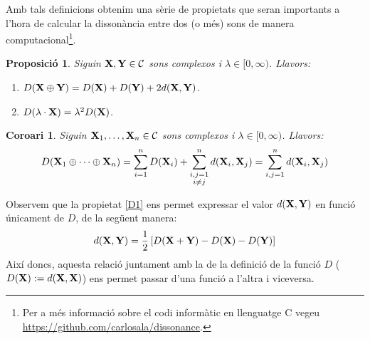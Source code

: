 \documentclass{article}
\theoremstyle{math}
\newtheorem{prop}[definition]{Proposició}
\newtheorem{corollary}[definition]{Coro\lgem ari}
\theoremstyle{TheoremNum}
\newcommand{\0}{\ensuremath{\vb{0}}}
\newcommand{\X}{\ensuremath{\vb{X}}}
\newcommand{\Y}{\ensuremath{\vb{Y}}}
\begin{document}
\noindent Amb tals definicions obtenim una sèrie de propietats que seran importants a l'hora de calcular la dissonància entre dos (o més) sons de manera computacional\footnote{Per a més informació sobre el codi informàtic en llenguatge C vegeu \url{https://github.com/carlosala/dissonance}.}.
\begin{prop}\label{prop_dem2}
  Siguin $\X,\Y\in\mathcal{C}$ sons complexos i $\lambda\in[0,\infty)$. Llavors:
  \begin{enumerate}[label=$D$\arabic*),ref=$D$\arabic*]
    \item\label{D1} $D(\X\oplus\Y)=D(\X)+D(\Y)+2d(\X,\Y)$.
    \item\label{D2} $D(\lambda\cdot \X)=\lambda^2D(\X)$.
  \end{enumerate}
\end{prop}
\begin{corollary}\label{coro_dem3}
  Siguin $\X_1,\ldots,\X_n\in\mathcal{C}$ sons complexos i $\lambda\in[0,\infty)$. Llavors:
  \begin{equation}\label{eq_final}
    D(\X_1\oplus\cdots\oplus\X_n)=\sum_{i=1}^nD(\X_i)+\sum_{\substack{i,j=1\\i\ne j}}^nd(\X_i,\X_j)=\sum_{i,j=1}^nd(\X_i,\X_j)
  \end{equation}
\end{corollary}
\noindent Observem que la propietat \ref{D1} ens permet expressar el valor $d(\X,\Y)$ en funció únicament de $D$, de la següent manera: $$d(\X,\Y)=\frac{1}{2}\left[D(\X+\Y)-D(\X)-D(\Y)\right]$$
Així doncs, aquesta relació juntament amb la de la definició de la funció $D$ ($D(\X):=d(\X,\X)$) ens permet passar d'una funció a l'altra i viceversa.\par
\end{document}
